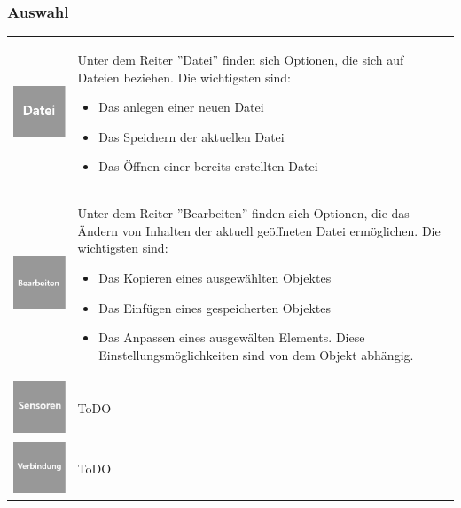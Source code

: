 \documentclass[parskip=full]{scrartcl}
\begin{document}
\subsubsection{Auswahl}

\begin{tabular}[t]{p{1cm} p{10cm}}
	\vspace{0cm}\includegraphics[width = 1 cm]{Grafik/Datei.jpg} & Unter dem Reiter ''Datei'' finden sich Optionen, die sich auf Dateien beziehen. Die wichtigsten sind: 
	\begin{itemize} 
		\item Das anlegen einer neuen Datei
		\item Das Speichern der aktuellen Datei
		\item Das Öffnen einer bereits erstellten Datei
	\end{itemize}\\
	\vspace{0cm}\includegraphics[width = 1 cm]{Grafik/Bearbeiten.jpg} & Unter dem Reiter ''Bearbeiten'' finden sich Optionen, die das Ändern von Inhalten der aktuell geöffneten Datei ermöglichen. Die wichtigsten sind:
	\begin{itemize} 
		\item Das Kopieren eines ausgewählten Objektes
		\item Das Einfügen eines gespeicherten Objektes
		\item Das Anpassen eines ausgewälten Elements. Diese Einstellungsmöglichkeiten sind von dem Objekt abhängig.
	\end{itemize}\\
	\vspace{0cm}\includegraphics[width = 1 cm]{Grafik/Sensor.jpg} & ToDO\\
	\vspace{0cm}\includegraphics[width = 1 cm]{Grafik/Verbindung.jpg} & ToDO\\

\end{tabular}
\end{document}
